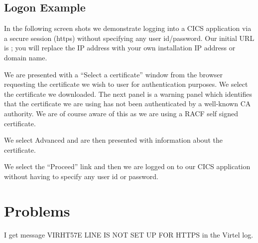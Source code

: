 \documentclass[letterpaper,10pt,english]{sphinxmanual}
\begin{document}
\subsection{Logon Example}
\label{\detokenize{TN202002:logon-example}}
In the following screen shots we demonstrate logging into a CICS application via a secure session (https) without specifying any user id/password. Our initial URL is ; you will replace the IP address with your own installation IP address or domain name.



We are presented with a “Select a certificate” window from the browser requesting the certificate we wish to user for authentication purposes. We select the certificate we downloaded.
The next panel is a warning panel which identifies that the certificate we are using has not been authenticated by a well-known CA authority. We are of course aware of this as we are using a RACF self signed certificate.



We select Advanced and are then presented with information about the certificate.



We select the “Proceed” link and then we are logged on to our CICS application without having to specify any user id or password.



\newpage


\section{Problems}
\label{\detokenize{TN202002:id2}}

I get message VIRHT57E LINE IS NOT SET UP FOR HTTPS in the Virtel log.

\end{document}

